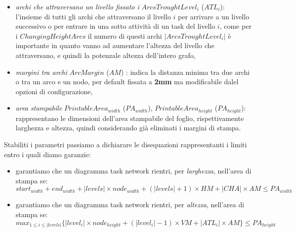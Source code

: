 \begin{itemize}
	\item \emph{archi che attraversano un livello fissato i} $ArcsTroughtLevel_i$ ($ATL_i$):
	l'insieme di tutti gli archi che attraversano il livello $i$ per arrivare a un livello successivo o per entrare in una sotto attivit\`a di un task del livello $i$, come per i $ChangingHeightArcs$ il numero di questi archi $|ArcsTroughtLevel_i|$ \`e importante in quanto vanno ad aumentare l'altezza del livello che attraversano, e quindi la potenzale altezza dell'intero grafo,
	\item \emph{margini tra archi} $ArcMargin$ ($AM$) : indica la distanza minima tra due archi o tra un arco e un nodo, per default fissata a \textbf{2mm} ma modificabile dalel opzioni di configurazione,
	\item \emph{area stampabile} $PrintableArea_{width}$ ($PA_{width}$), $PrintableArea_{height}$ ($PA_{height}$): rappresentano le dimensioni dell'area stampabile del foglio, rispettivamente larghezza e altezza, quindi considerando gi\`a eliminati i margini di stampa.
\end{itemize}

Stabiliti i parametri passiamo a dichiarare le disequazioni rappresentanti i limiti entro i quali diamo garanzie:
\begin{itemize}
	\item garantiamo che un diagramma task network rientri, per \emph{larghezza}, nell'area di stampa se:
	$$ start_{width} + end_{width} + |levels| \times node_{width} + 	
	(|levels|+1) \times HM + |CHA| \times AM
	\leq PA_{width} $$
	\item garantiamo che un diagramma task network rientri, per \emph{altezza}, nell'area di stampa se:
	$$ max_{1 \leq i \leq |levels|}\{ |level_i| \times node_{height} +
	(|level_i|-1) \times VM + |ATL_i| \times AM \} 
	\leq PA_{height} $$
\end{itemize}


